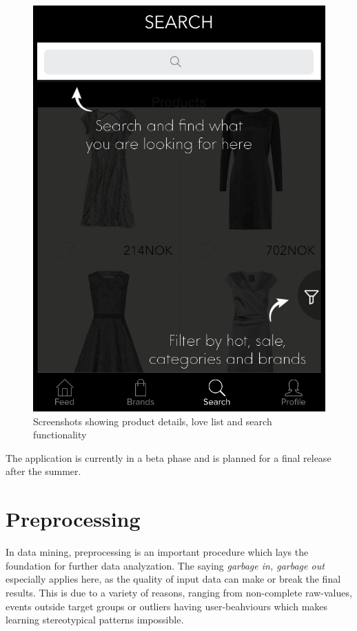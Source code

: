\begin{figure}[H]
\begin{minipage}{.3\linewidth}
        \includegraphics[height=1.5\linewidth]{image/SoBazaarsearch.png}
    \end{minipage}
    \caption{Screenshots showing product details, love list and search functionality}
    \label{figure:SoBazaarfeed3}
\end{figure}

The application is currently in a beta phase and is planned for a final release after the summer.

\section{Preprocessing}
\label{sec:preprocessing}

In data mining, preprocessing is an important procedure which lays the
foundation for further data analyzation. The saying \emph{garbage in, garbage
out}~\cite{GIGO} especially applies here, as the quality of input data can make or
break the final results. This is due to a variety of reasons, ranging from
non-complete raw-values, events outside target groups or outliers having
user-beahviours which makes learning stereotypical patterns impossible.

